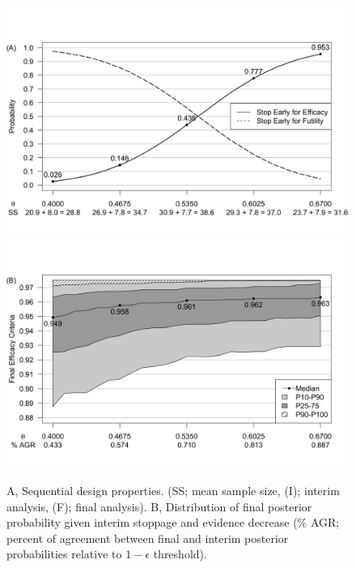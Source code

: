\documentclass[12pt]{article}
\begin{document}
\begin{figure}[htbp]
\begin{center}

    \includegraphics[width=6in]{./figures/figure3a.png}
    \includegraphics[width=6in]{./figures/figure3b.png}
    \caption{A, Sequential design properties. (SS; mean sample size, (I); interim analysis, (F); final analysis). B, Distribution of final posterior probability given interim stoppage and evidence decrease ($\%$ AGR; percent of agreement between final and interim posterior probabilities relative to $1-\epsilon$ threshold).}
	\label{fig:ex1.1}

\end{center}
\end{figure}
\end{document}
